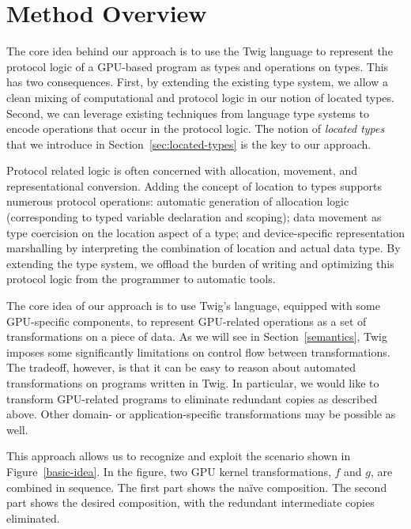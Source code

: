 
\section{Method Overview}


The core idea behind our approach is to use the Twig language to
represent the protocol logic of a GPU-based program as types and
operations on types.  This has two consequences.  First, by extending
the existing type system, we allow a clean mixing of computational and
protocol logic in our notion of located types.  Second, we can
leverage existing techniques from language type systems to encode
operations that occur in the protocol logic.  The notion of
\emph{located types} that we introduce in
Section~\ref{sec:located-types} is the key to our approach.  

Protocol related logic is often concerned with allocation, movement,
and representational conversion.  Adding the concept of location to
types supports numerous protocol operations: automatic generation of
allocation logic (corresponding to typed variable declaration and
scoping); data movement as type coercision on the location aspect of a
type; and device-specific representation marshalling by interpreting
the combination of location and actual data type.  By extending the 
type system, we offload the burden of writing and optimizing this
protocol logic from the programmer to automatic tools.


The core idea of our approach is to use Twig's language, equipped with some
GPU-specific components, to represent GPU-related operations as a set of
transformations on a piece of data. As we will see in Section~\ref{semantics},
Twig imposes some significantly limitations on control flow between
transformations. The tradeoff, however, is that it can be easy to reason about
automated transformations on programs written in Twig. In particular, we would
like to transform GPU-related programs to eliminate redundant copies as
described above. Other domain- or application-specific transformations may be
possible as well.

This approach allows us to recognize and exploit the scenario shown in
Figure~\ref{basic-idea}. In the figure, two GPU kernel transformations, $f$ and
$g$, are combined in sequence. The first part shows the na\"ive composition. The
second part shows the desired composition, with the redundant intermediate
copies eliminated.

